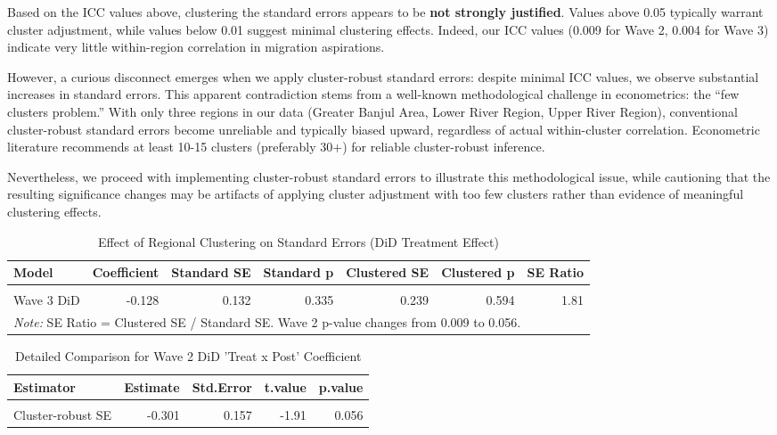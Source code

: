 \documentclass[
]{article}
\begin{document}
Based on the ICC values above, clustering the standard errors appears to
be \textbf{not strongly justified}. Values above 0.05 typically warrant
cluster adjustment, while values below 0.01 suggest minimal clustering
effects. Indeed, our ICC values (0.009 for Wave 2, 0.004 for Wave 3)
indicate very little within-region correlation in migration aspirations.

However, a curious disconnect emerges when we apply cluster-robust
standard errors: despite minimal ICC values, we observe substantial
increases in standard errors. This apparent contradiction stems from a
well-known methodological challenge in econometrics: the ``few clusters
problem.'' With only three regions in our data (Greater Banjul Area,
Lower River Region, Upper River Region), conventional cluster-robust
standard errors become unreliable and typically biased upward,
regardless of actual within-cluster correlation. Econometric literature
recommends at least 10-15 clusters (preferably 30+) for reliable
cluster-robust inference.

Nevertheless, we proceed with implementing cluster-robust standard
errors to illustrate this methodological issue, while cautioning that
the resulting significance changes may be artifacts of applying cluster
adjustment with too few clusters rather than evidence of meaningful
clustering effects.

\begin{table}[H]
\centering
\caption{\label{tab:robust-clustered-se-simple}Effect of Regional Clustering on Standard Errors (DiD Treatment Effect)}
\centering
\fontsize{9}{11}\selectfont
\begin{tabular}[t]{lrrrrrr}
\toprule
Model & Coefficient & Standard SE & Standard p & Clustered SE & Clustered p & SE Ratio\\
\midrule
\cellcolor{gray!10}{Wave 2 DiD} & \cellcolor{gray!10}{-0.301} & \cellcolor{gray!10}{0.116} & \cellcolor{gray!10}{0.009} & \cellcolor{gray!10}{0.157} & \cellcolor{gray!10}{0.056} & \cellcolor{gray!10}{1.36}\\
Wave 3 DiD & -0.128 & 0.132 & 0.335 & 0.239 & 0.594 & 1.81\\
\bottomrule
\multicolumn{7}{l}{\rule{0pt}{1em}\textit{Note: } SE Ratio = Clustered SE / Standard SE. Wave 2 p-value changes from 0.009 to 0.056.}\\
\end{tabular}
\end{table}

\begin{table}[H]
\centering
\caption{\label{tab:robust-clustered-se-simple}Detailed Comparison for Wave 2 DiD 'Treat x Post' Coefficient}
\centering
\fontsize{9}{11}\selectfont
\begin{tabular}[t]{lrrrr}
\toprule
Estimator & Estimate & Std.Error & t.value & p.value\\
\midrule
\cellcolor{gray!10}{Conventional SE} & \cellcolor{gray!10}{-0.301} & \cellcolor{gray!10}{0.116} & \cellcolor{gray!10}{-2.60} & \cellcolor{gray!10}{0.009}\\
Cluster-robust SE & -0.301 & 0.157 & -1.91 & 0.056\\
\bottomrule
\end{tabular}
\end{table}
\end{document}
